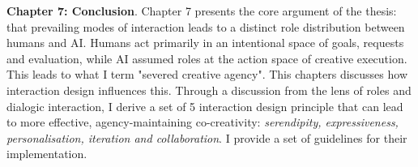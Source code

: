 \textbf{Chapter 7: Conclusion}. Chapter 7 presents the core argument of the thesis: that prevailing modes of interaction leads to a distinct role distribution between humans and AI. Humans act primarily in an intentional space of goals, requests and evaluation, while AI assumed roles at the action space of creative execution. This leads to what I term "severed creative agency". This chapters discusses how interaction design influences this. Through a discussion from the lens of roles and dialogic interaction, I derive a set of 5 interaction design principle that can lead to more effective, agency-maintaining co-creativity: \textit{serendipity, expressiveness, personalisation, iteration and collaboration}. I provide a set of guidelines for their implementation. 

